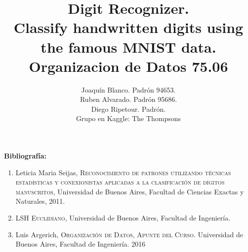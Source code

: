 \documentclass[a4paper,11pt]{report}
\title{Digit Recognizer. \\ 
  Classify handwritten digits using the famous MNIST data.\\
  Organizacion de Datos 75.06}
\author{Joaquín Blanco. Padrón 94653.\\
  Ruben Alvarado. Padrón 95686.\\
  Diego Ripetour. Padrón.\\
  Grupo en Kaggle: The Thompsons}
\begin{document}
\maketitle
\tableofcontents






\textbf{Bibliografía:}
\begin{enumerate}
  \item Leticia Maria Seijas, \textsc{Reconocimiento de patrones utilizando técnicas estadísticas y conexionistas aplicadas a la clasificación de dígitos manuscritos}, Universidad de Buenos Aires, Facultad de Ciencias Exactas y Naturales, 2011.
  \item \textsc{LSH Euclidiano}, Universidad de Buenos Aires, Facultad de Ingeniería.
  \item Luis Argerich, \textsc{Organización de Datos, Apunte del Curso.} Universidad de Buenos Aires, Facultad de Ingeniería. 2016

\end{enumerate}
\end{document}
